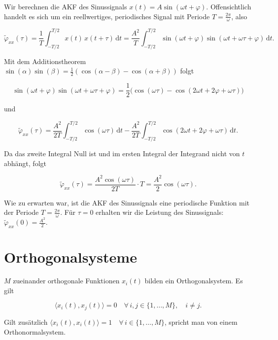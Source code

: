 \begin{beispiel}
Wir berechnen die AKF des Sinussignals $x(t) = A\sin(\omega t + \varphi)$. Offensichtlich handelt es sich um ein reellwertiges, periodisches Signal mit Periode $T = \frac{2\pi}{\omega}$, also

$$
\tilde{\varphi}_{xx}(\tau) = \frac{1}{T}\int_{-T/2}^{T/2} x(t)\,x(t+\tau)\,\mathrm{d}t = \frac{A^2}{T}\int_{-T/2}^{T/2} \sin(\omega t + \varphi)\sin(\omega t + \omega\tau + \varphi)\,\mathrm{d}t.
$$

Mit dem Additionstheorem $\sin(\alpha)\sin(\beta) = \frac{1}{2}(\cos(\alpha-\beta) - \cos(\alpha+\beta))$ folgt

$$
\sin(\omega t+\varphi)\sin(\omega t+\omega\tau+\varphi) = \frac{1}{2}\bigl(\cos(\omega\tau) - \cos(2\omega t + 2\varphi + \omega\tau)\bigr)
$$

und

$$
\tilde{\varphi}_{xx}(\tau) = \frac{A^2}{2T}\int_{-T/2}^{T/2}\cos(\omega\tau)\,\mathrm{d}t - \frac{A^2}{2T}\int_{-T/2}^{T/2}\cos(2\omega t + 2\varphi + \omega\tau)\,\mathrm{d}t.
$$

Da das zweite Integral Null ist und im ersten Integral der Integrand nicht von $t$ abhängt, folgt

$$
\tilde{\varphi}_{xx}(\tau) = \frac{A^2\cos(\omega\tau)}{2T}\cdot T = \frac{A^2}{2}\cos(\omega\tau).
$$

Wie zu erwarten war, ist die AKF des Sinussignals eine periodische Funktion mit der Periode $T = \frac{2\pi}{\omega}$. Für $\tau = 0$ erhalten wir die Leistung des Sinussignals: $\tilde{\varphi}_{xx}(0) = \frac{A^2}{2}$.
\end{beispiel}

\section{Orthogonalsysteme}
\label{sec:orthogonalsysteme}

\begin{definition}
$M$ zueinander orthogonale Funktionen $x_i(t)$ bilden ein Orthogonalsystem. Es gilt

$$
\langle x_i(t), x_j(t) \rangle = 0 \quad \forall\, i, j \in \{1, \ldots, M\},\quad i \neq j.
$$

Gilt zusätzlich $\langle x_i(t), x_i(t) \rangle = 1 \quad \forall\, i \in \{1, \ldots, M\}$, spricht man von einem Orthonormalsystem.
\end{definition}

